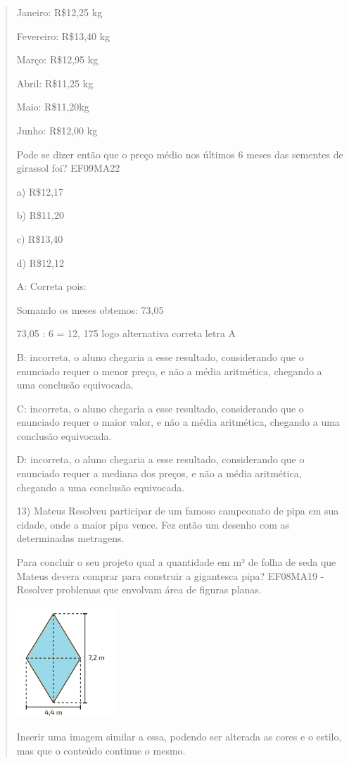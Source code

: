 \begin{quote}
\begin{escolha}
Janeiro: R\$12,25 kg

Fevereiro: R\$13,40 kg

Março: R\$12,95 kg

Abril: R\$11,25 kg

Maio: R\$11,20kg

Junho: R\$12,00 kg

Pode se dizer então que o preço médio nos últimos 6 meses das sementes
de girassol foi? EF09MA22

a) R\$12,17

b) R\$11,20

c) R\$13,40

d) R\$12,12

A: Correta pois:

Somando os meses obtemos: 73,05

73,05 : 6 = 12, 175 logo alternativa correta letra A

B: incorreta, o aluno chegaria a esse resultado, considerando que o
enunciado requer o menor preço, e não a média aritmética, chegando a uma
conclusão equivocada.

C: incorreta, o aluno chegaria a esse resultado, considerando que o
enunciado requer o maior valor, e não a média aritmética, chegando a uma
conclusão equivocada.

D: incorreta, o aluno chegaria a esse resultado, considerando que o
enunciado requer a mediana dos preços, e não a média aritmética,
chegando a uma conclusão equivocada.

13) Mateus Resolveu participar de um famoso campeonato de pipa em sua
cidade, onde a maior pipa vence. Fez então um desenho com as
determinadas metragens.

Para concluir o seu projeto qual a quantidade em m² de folha de seda que
Mateus devera comprar para construir a gigantesca pipa? EF08MA19 -
Resolver problemas que envolvam área de figuras planas.

\includegraphics[width=1.45833in,height=1.63333in]{./imgSAEB_8_MAT/media/image59.png}

Inserir uma imagem similar a essa, podendo ser alterada as cores e o
estilo, mas que o conteúdo continue o mesmo.


\end{escolha}
\end{quote}
